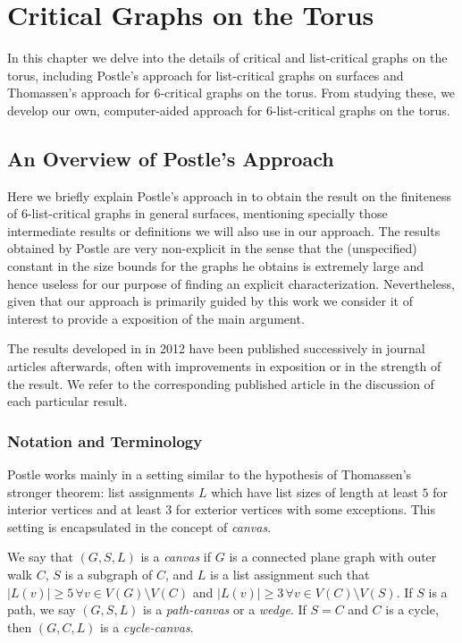 \chapter{Critical Graphs on the Torus}

In this chapter we delve into the details of critical and list-critical graphs on the torus,
including Postle's approach for list-critical graphs on surfaces and Thomassen's approach
for $6$-critical graphs on the torus. 
From studying these, we develop our own, computer-aided approach
for $6$-list-critical graphs on the torus.

\section{An Overview of Postle's Approach}

Here we briefly explain Postle's approach in \cite{postlethesis} to obtain the result on the finiteness of 6-list-critical graphs in general surfaces, mentioning specially those intermediate results or definitions we will also use in our approach. The results obtained by Postle are very non-explicit in the sense that the (unspecified) constant in the size bounds for the graphs he obtains is extremely large and hence useless for our purpose of finding an explicit characterization. Nevertheless, given that our approach is primarily guided by this work we consider it of interest to provide a exposition of the main argument.

The results developed in \cite{postlethesis} in 2012 have been published successively in journal articles afterwards, often with improvements in exposition or in the strength of the result. We refer to the corresponding published article in the discussion of each particular result.

\subsection{Notation and Terminology}

Postle works mainly in a setting similar to the hypothesis of Thomassen's stronger theorem: list assignments $L$ which have list sizes of length at least $5$ for interior vertices and at least $3$ for exterior vertices with some exceptions. This setting is encapsulated in the concept of \emph{canvas}.

\begin{definition}[Canvas]
We say that $(G, S, L)$ is a \emph{canvas} if $G$ is a connected plane graph
 with outer walk $C$, $S$ is a subgraph of $C$, and $L$ is a list assignment
  such that $|L(v)| \geq 5 \, \forall v \in V(G) \setminus V(C)$ and
   $|L(v)| \geq 3 \, \forall v \in V(C) \setminus V(S)$. If $S$ is a path,
    we say $(G, S, L)$ is a \emph{path-canvas} or a \emph{wedge}. If $S = C$ and 
    $C$ is a cycle, then $(G, C, L)$ is a \emph{cycle-canvas}.
\end{definition} 



